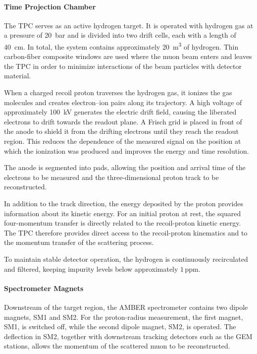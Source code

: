 \paragraph{Time Projection Chamber}

The TPC serves as an active hydrogen target. It is operated with hydrogen gas at a pressure of \qty{20}{\bar} and is divided into two drift cells, each with a length of \qty{40}{\centi\meter}. In total, the system contains approximately \qty{20}{\meter\cubed} of hydrogen. Thin carbon-fiber composite windows are used where the muon beam enters and leaves the TPC in order to minimize interactions of the beam particles with detector material.

When a charged recoil proton traverses the hydrogen gas, it ionizes the gas molecules and creates electron--ion pairs along its trajectory. A high voltage of approximately \qty{100}{\kilo\volt} generates the electric drift field, causing the liberated electrons to drift towards the readout plane. A Frisch grid is placed in front of the anode to shield it from the drifting electrons until they reach the readout region. This reduces the dependence of the measured signal on the position at which the ionization was produced and improves the energy and time resolution.

The anode is segmented into pads, allowing the position and arrival time of the electrons to be measured and the three-dimensional proton track to be reconstructed. 

In addition to the track direction, the energy deposited by the proton provides information about its kinetic energy. For an initial proton at rest, the squared four-momentum transfer is directly related to the recoil-proton kinetic energy. The TPC therefore provides direct access to the recoil-proton kinematics and to the momentum transfer of the scattering process.

To maintain stable detector operation, the hydrogen is continuously recirculated and filtered, keeping impurity levels below approximately \(1\,\mathrm{ppm}\).

\paragraph{Spectrometer Magnets}

Downstream of the target region, the AMBER spectrometer contains two dipole magnets, SM1 and SM2. For the proton-radius measurement, the first magnet, SM1, is switched off, while the second dipole magnet, SM2, is operated. The deflection in SM2, together with downstream tracking detectors such as the GEM stations, allows the momentum of the scattered muon to be reconstructed.

